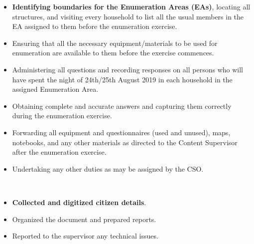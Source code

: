 \documentclass[theme]{cv_einstein}
\begin{document}
\begin{paracol}{2}
        \begin{rightcolumn}\noindent \small
            {
                \begin{itemize}
                    \item \textbf{Identifying boundaries for the Enumeration Areas (EAs)}, locating all structures, and visiting every household to list all the usual members in the EA assigned to them before the enumeration exercise.
                    \item Ensuring that all the necessary equipment/materials to be used for enumeration are available to them before the exercise commences.
                    \item Administering all questions and recording responses on all persons who will have spent the night of 24th/25th August 2019 in each household in the assigned Enumeration Area.
                    \item Obtaining complete and accurate answers and capturing them correctly during the enumeration exercise.
                    \item Forwarding all equipment and questionnaires (used and unused), maps, notebooks, and any other materials as directed to the Content Supervisor after the enumeration exercise.
                    \item Undertaking any other duties as may be assigned by the CSO.
                \end{itemize}
            }
            \vspace{\itemspace}\\
            
            {
                \begin{itemize}
                    \item \textbf{Collected and digitized citizen details}.
                    \item Organized the document and prepared reports.
                    \item Reported to the supervisor any technical issues.
                \end{itemize}
            }
            \vspace{\itemspace}\\
            

\end{rightcolumn}
\end{paracol}
\end{document}
